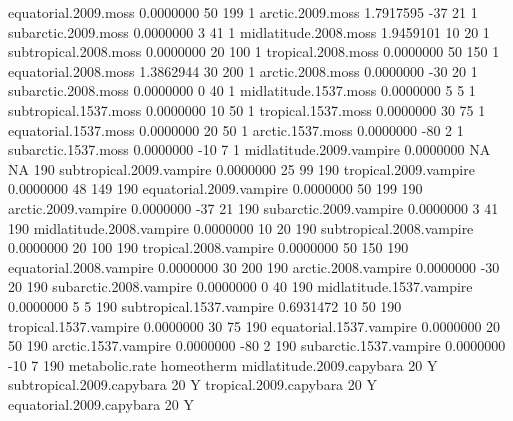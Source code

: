 \documentclass{article}
\numberwithin{exercise}{section}
\begin{document}
\begin{Schunk}
\begin{Soutput}
equatorial.2009.moss      0.0000000          50           199         1
arctic.2009.moss          1.7917595         -37            21         1
subarctic.2009.moss       0.0000000           3            41         1
midlatitude.2008.moss     1.9459101          10            20         1
subtropical.2008.moss     0.0000000          20           100         1
tropical.2008.moss        0.0000000          50           150         1
equatorial.2008.moss      1.3862944          30           200         1
arctic.2008.moss          0.0000000         -30            20         1
subarctic.2008.moss       0.0000000           0            40         1
midlatitude.1537.moss     0.0000000           5             5         1
subtropical.1537.moss     0.0000000          10            50         1
tropical.1537.moss        0.0000000          30            75         1
equatorial.1537.moss      0.0000000          20            50         1
arctic.1537.moss          0.0000000         -80             2         1
subarctic.1537.moss       0.0000000         -10             7         1
midlatitude.2009.vampire  0.0000000          NA            NA       190
subtropical.2009.vampire  0.0000000          25            99       190
tropical.2009.vampire     0.0000000          48           149       190
equatorial.2009.vampire   0.0000000          50           199       190
arctic.2009.vampire       0.0000000         -37            21       190
subarctic.2009.vampire    0.0000000           3            41       190
midlatitude.2008.vampire  0.0000000          10            20       190
subtropical.2008.vampire  0.0000000          20           100       190
tropical.2008.vampire     0.0000000          50           150       190
equatorial.2008.vampire   0.0000000          30           200       190
arctic.2008.vampire       0.0000000         -30            20       190
subarctic.2008.vampire    0.0000000           0            40       190
midlatitude.1537.vampire  0.0000000           5             5       190
subtropical.1537.vampire  0.6931472          10            50       190
tropical.1537.vampire     0.0000000          30            75       190
equatorial.1537.vampire   0.0000000          20            50       190
arctic.1537.vampire       0.0000000         -80             2       190
subarctic.1537.vampire    0.0000000         -10             7       190
                          metabolic.rate homeotherm
midlatitude.2009.capybara             20          Y
subtropical.2009.capybara             20          Y
tropical.2009.capybara                20          Y
equatorial.2009.capybara              20          Y

\end{Soutput}
\end{Schunk}
\end{document}
